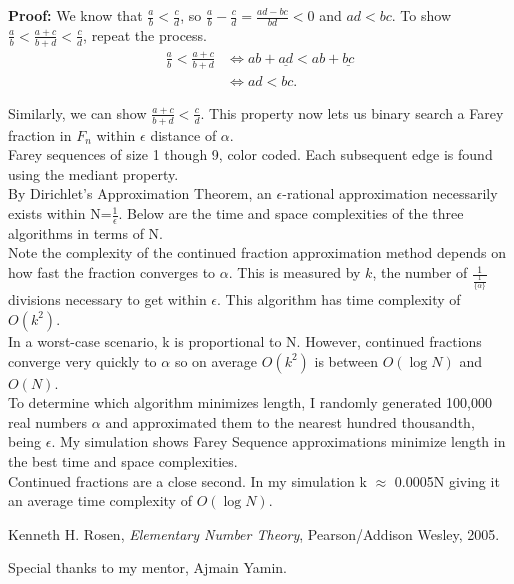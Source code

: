 \documentclass[11pt]{article}
\begin{document}
\textbf{Proof:} We know that $\frac{a}{b} < \frac{c}{d}$, so $\frac{a}{b} - \frac{c}{d} = \frac{ad-bc}{bd} < 0$ and $ad < bc$. To show $\frac{a}{b} < \frac{a+c}{b+d} < \frac{c}{d}$, repeat the process.
\begin{align*}
\frac{a}{b} < \frac{a+c}{b+d} &\iff ab+\underline{ad} < ab+\underline{bc} \\
&\iff ad < bc.
\end{align*}

Similarly, we can show $\frac{a+c}{b+d} < \frac{c}{d}$. This property now lets us binary search a Farey fraction in $F_n$ within $\epsilon$ distance of $\alpha$.\\

Farey sequences of size 1 though 9, color coded. Each subsequent edge is found using the mediant property.\\

By Dirichlet's Approximation Theorem, an $\epsilon$-rational approximation necessarily exists within N=$\frac{1}{\epsilon}$. Below are the time and space complexities of the three algorithms in terms of N.\\

Note the complexity of the continued fraction approximation method depends on how fast the fraction converges to $\alpha$. This is measured by $k$, the number of $\frac{1}{\frac{1}{\{\alpha\}}}$ divisions necessary to get within $\epsilon$. This algorithm has time complexity of $O(k^2)$. \\

In a worst-case scenario, k is proportional to N. However, continued fractions converge very quickly to $\alpha$ so on average $O(k^2)$ is between $O(\log N)$ and $O(N)$.\\

To determine which algorithm minimizes length, I randomly generated 100,000 real numbers $\alpha$ and approximated them to the nearest hundred thousandth, being $\epsilon$. My simulation shows Farey Sequence approximations minimize length in the best time and space complexities.\\

Continued fractions are a close second. In my simulation k $\approx$ 0.0005N giving it an average time complexity of $O(\log N)$.\\

\begin{thebibliography}{9}
Kenneth H. Rosen,
\textit{Elementary Number Theory},
Pearson/Addison Wesley, 2005.
\end{thebibliography}
Special thanks to my mentor, Ajmain Yamin.
\end{document}
